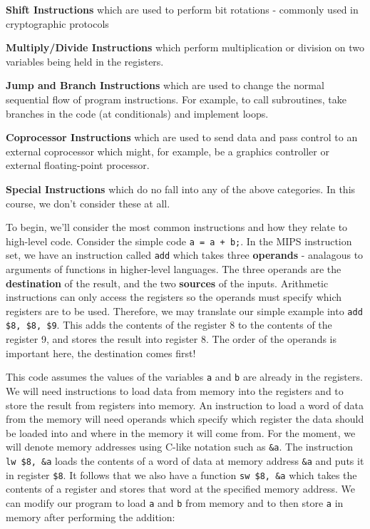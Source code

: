 \documentclass{article}
\begin{document}
	\par 
	\textbf{Shift Instructions} which are used to perform bit rotations - commonly used in cryptographic protocols
	
	\par 
	\textbf{Multiply/Divide Instructions} which perform multiplication or division on two variables being held in the registers.
	
	\par 
	\textbf{Jump and Branch Instructions} which are used to change the normal sequential flow of program instructions. For example, to call subroutines, take branches in the code (at conditionals) and implement loops.
	
	\par 
	\textbf{Coprocessor Instructions} which are used to send data and pass control to an external coprocessor which might, for example, be a graphics controller or external floating-point processor.
	
	\par 
	\textbf{Special Instructions} which do no fall into any of the above categories. In this course, we don't consider these at all.
	
	\par 
	To begin, we'll consider the most common instructions and how they relate to high-level code. Consider the simple code \texttt{a = a + b;}. In the MIPS instruction set, we have an instruction called \texttt{add} which takes three \textbf{operands} - analagous to arguments of functions in higher-level languages. The three operands are the \textbf{destination} of the result, and the two \textbf{sources} of the inputs. Arithmetic instructions can only access the registers so the operands must specify which registers are to be used. Therefore, we may translate our simple example into \texttt{add \$8, \$8, \$9}. This adds the contents of the register 8 to the contents of the register 9, and stores the result into register 8. The order of the operands is important here, the destination comes first!
	
	\par
	This code assumes the values of the variables \texttt{a} and \texttt{b} are already in the registers. We will need instructions to load data from memory into the registers and to store the result from registers into memory. An instruction to load a word of data from the memory will need operands which specify which register the data should be loaded into and where in the memory it will come from. For the moment, we will denote memory addresses using C-like notation such as \texttt{\&a}. The instruction \texttt{lw \$8, \&a} loads the contents of a word of data at memory address \texttt{\&a} and puts it in register \texttt{\$8}. It follows that we also have a function \texttt{sw \$8, \&a} which takes the contents of a register and stores that word at the specified memory address. We can modify our program to load \texttt{a} and \texttt{b} from memory and to then store \texttt{a} in memory after performing the addition:
	
\end{document}
